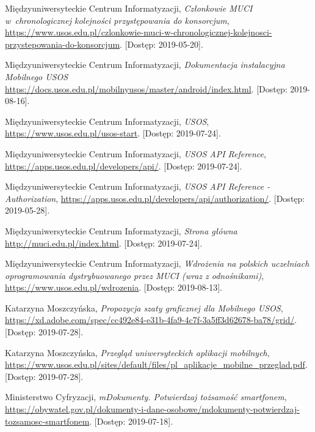 \documentclass{pracamgr}
\begin{document}
\begin{thebibliography}{99}
 Międzyuniwersyteckie Centrum Informatyzacji, \textit{Członkowie MUCI w~chronologicznej kolejności przystępowania do konsorcjum}, \url{https://www.usos.edu.pl/czlonkowie-muci-w-chronologicznej-kolejnosci-przystepowania-do-konsorcjum}. [Dostęp: 2019-05-20].

 Międzyuniwersyteckie Centrum Informatyzacji,
\textit{Dokumentacja instalacyjna Mobilnego USOS}
\url{https://docs.usos.edu.pl/mobilnyusos/master/android/index.html}. [Dostęp: 2019-08-16].

 Międzyuniwersyteckie Centrum Informatyzacji, \textit{USOS},
\url{https://www.usos.edu.pl/usos-start}. [Dostęp: 2019-07-24].

 Międzyuniwersyteckie Centrum Informatyzacji, \textit{USOS API Reference},
\url{https://apps.usos.edu.pl/developers/api/}. [Dostęp: 2019-07-24].

 Międzyuniwersyteckie Centrum Informatyzacji, \textit{USOS API Reference - Authorization}, \url{https://apps.usos.edu.pl/developers/api/authorization/}. [Dostęp: 2019-05-28].

 Międzyuniwersyteckie Centrum Informatyzacji, \textit{Strona główna}
\url{http://muci.edu.pl/index.html}. [Dostęp: 2019-07-24].

 Międzyuniwersyteckie Centrum Informatyzacji, \textit{Wdrożenia na polskich uczelniach oprogramowania dystrybuowanego przez MUCI  (wraz z odnośnikami)},\\
\url{https://www.usos.edu.pl/wdrozenia}. [Dostęp: 2019-08-13].


  Katarzyna Moszczyńska, \textit{Propozycja szaty graficznej dla Mobilnego USOS},\\
\url{https://xd.adobe.com/spec/cc492e84-e31b-4fa9-4c7f-3a5ff3d62678-ba78/grid/}. [Dostęp: 2019-07-28].

  Katarzyna Moszczyńska, \textit{Przegląd uniwersyteckich aplikacji mobilnych},\\
\url{https://www.usos.edu.pl/sites/default/files/pl_aplikacje_mobilne_przeglad.pdf}. [Dostęp: 2019-07-28].


 Ministerstwo Cyfryzacji, \textit{mDokumenty. Potwierdzaj tożsamość smartfonem},\\ \url{https://obywatel.gov.pl/dokumenty-i-dane-osobowe/mdokumenty-potwierdzaj-tozsamosc-smartfonem}. [Dostęp: 2019-07-18].



\end{thebibliography}
\end{document}
